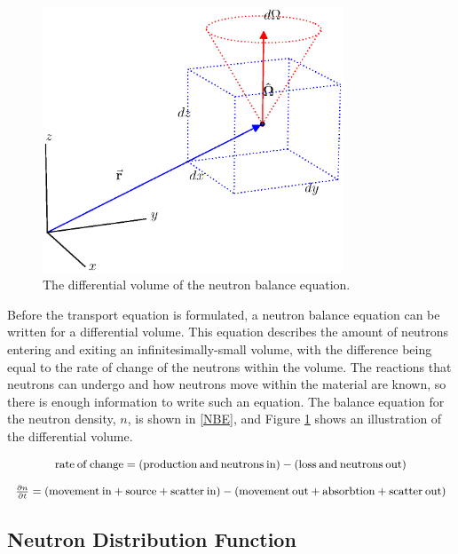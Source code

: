 \begin{figure}[h!] 
  \centering
    \includegraphics[width=0.8\textwidth,trim= 0cm 2.5cm 0cm 0cm]{graphics/diff_balance.eps} 
     \caption{The differential volume of the neutron balance equation. \label{diff_volume}}
\end{figure}

Before the transport equation is formulated, a neutron balance equation can be written for a differential volume.  This equation describes the amount of neutrons entering and exiting an infinitesimally-small volume, with the difference being equal to the rate of change of the neutrons within the volume.  The reactions that neutrons can undergo and how neutrons move within the material are known, so there is enough information to write such an equation.   The balance equation for the neutron density, $n$, is shown in \eqref{NBE}, and Figure \ref{diff_volume} shows an illustration of the differential volume.

\begin{equation}
\footnotesize
\begin{array}{c}
\mathrm{rate\:of\:change} = (\mathrm{production\:and\:neutrons\:in}) - (\mathrm{loss\:and\:neutrons\:out}) \\
\\
\frac{\partial n}{\partial t} = ( \mathrm{movement\:in} + \mathrm{source} + \mathrm{scatter\:in}) - ( \mathrm{movement\:out} + \mathrm{absorbtion} + \mathrm{scatter\:out})
\end{array}
\label{NBE}
\end{equation}


\subsection{Neutron Distribution Function}

